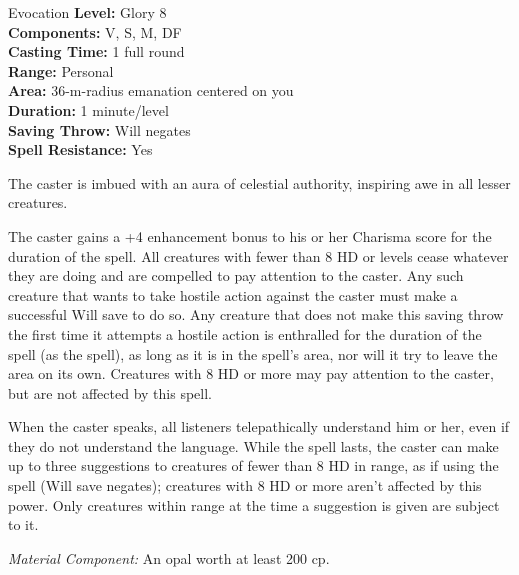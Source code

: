 {Evocation}
{
	\textbf{Level:} Glory 8\\
	\textbf{Components:} V, S, M, DF\\
	\textbf{Casting Time:} 1 full round\\
	\textbf{Range:} Personal\\
	\textbf{Area:} 36-m-radius emanation centered on you\\
	\textbf{Duration:} 1 minute/level\\
	\textbf{Saving Throw:} Will negates\\
	\textbf{Spell Resistance:} Yes\\
}
{
	The caster is imbued with an aura of celestial authority, inspiring awe in all lesser creatures.
	
	The caster gains a +4 enhancement bonus to his or her Charisma score for the duration of the spell. All creatures with fewer than 8 HD or levels cease whatever they are doing and are compelled to pay attention to the caster. Any such creature that wants to take hostile action against the caster must make a successful Will save to do so. Any creature that does not make this saving throw the first time it attempts a hostile action is enthralled for the duration of the spell (as the  spell), as long as it is in the spell's area, nor will it try to leave the area on its own. Creatures with 8 HD or more may pay attention to the caster, but are not affected by this spell.

	When the caster speaks, all listeners telepathically understand him or her, even if they do not understand the language. While the spell lasts, the caster can make up to three suggestions to creatures of fewer than 8 HD in range, as if using the  spell (Will save negates); creatures with 8 HD or more aren't affected by this power. Only creatures within range at the time a suggestion is given are subject to it.

	\textit{Material Component:} An opal worth at least 200 cp.
}